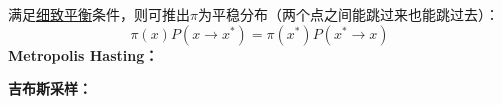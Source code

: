 \documentclass[UTF8]{ctexart} %
\begin{document}
				满足\uline{细致平衡}条件，则可推出$\pi$为平稳分布（两个点之间能跳过来也能跳过去）：
				\[\pi(x)P(x\rightarrow x^*) = \pi(x^*)P(x^*\rightarrow x)\]
				\textbf{Metropolis Hasting：}
				\begin{figure}[H]
				\end{figure}	
				\begin{figure}[H]
				\end{figure}		
				\textbf{吉布斯采样：}	
				\begin{figure}[H]
				\end{figure}	
\end{document}
